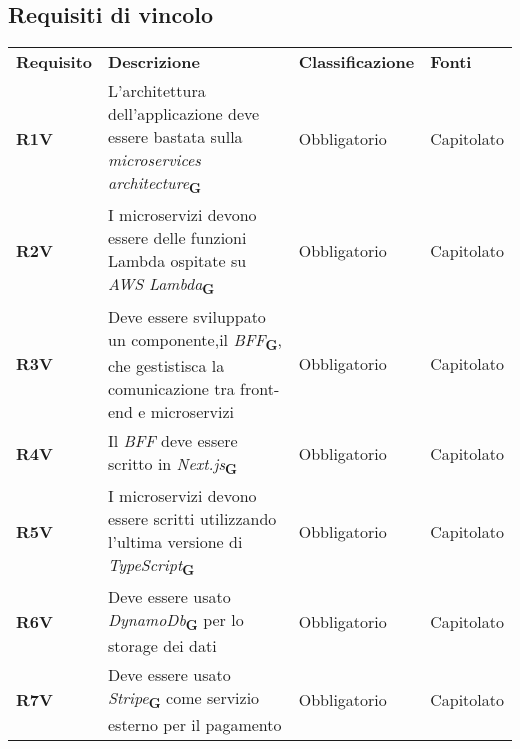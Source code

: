 \subsection{Requisiti di vincolo}
\begin{center}
    \centering
    \renewcommand{\arraystretch}{1.8}
    \label{tab:RequisitiVincolo}
    \begin{longtable}[!h]{p{50px} p{200px} p{100px} p{50px}}
        \rowcolor{logo!70} \textbf{Requisito} & \textbf{Descrizione}                                                                                                                                   & \textbf{Classificazione} & \textbf{Fonti} \\
        \textbf{R1V}                          & L'architettura dell'applicazione deve essere bastata sulla \textit{microservices architecture}\textsubscript{\textbf{G}}                               & Obbligatorio             & Capitolato     \\
        \textbf{R2V}                          & I microservizi devono essere delle funzioni \newline Lambda ospitate su \textit{AWS Lambda}\textsubscript{\textbf{G}}                                  & Obbligatorio             & Capitolato     \\
        \textbf{R3V}                          & Deve essere sviluppato un componente,\newline il \textit{BFF}\textsubscript{\textbf{G}}, che gestistisca la comunicazione tra front-end e microservizi & Obbligatorio             & Capitolato     \\
        \textbf{R4V}                          & Il \textit{BFF} deve essere scritto in \textit{Next.js}\textsubscript{\textbf{G}}                                                                      & Obbligatorio             & Capitolato     \\
        \textbf{R5V}                          & I microservizi devono essere scritti utilizzando l'ultima versione di \textit{TypeScript}\textsubscript{\textbf{G}}                                             & Obbligatorio             & Capitolato     \\
        \textbf{R6V}                          & Deve essere usato \textit{DynamoDb}\textsubscript{\textbf{G}} per lo storage dei dati                                                                  & Obbligatorio             & Capitolato     \\
        \textbf{R7V}                          & Deve essere usato \textit{Stripe}\textsubscript{\textbf{G}} come servizio esterno per il pagamento                                                     & Obbligatorio             & Capitolato     \\

\end{longtable}
\end{center}
